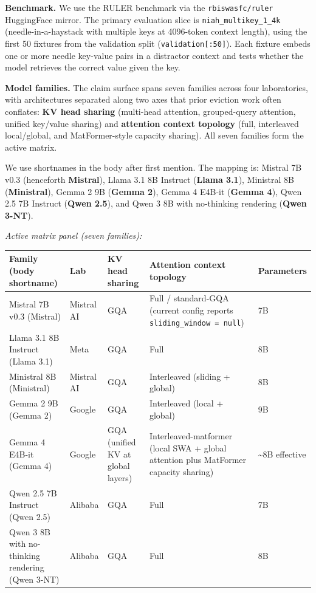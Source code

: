 \documentclass[
]{article}
\newcounter{none} %
\begin{document}
\textbf{Benchmark.} We use the RULER benchmark \citep{hsieh2024ruler} via
the \texttt{rbiswasfc/ruler} HuggingFace mirror. The primary evaluation
slice is \texttt{niah\_multikey\_1\_4k} (needle-in-a-haystack with
multiple keys at 4096-token context length), using the first 50 fixtures
from the validation split (\texttt{validation{[}:50{]}}). Each fixture
embeds one or more needle key-value pairs in a distractor context and
tests whether the model retrieves the correct value given the key.

\textbf{Model families.} The claim surface spans seven families across
four laboratories, with architectures separated along two axes that
prior eviction work often conflates: \textbf{KV head sharing}
(multi-head attention, grouped-query attention, unified key/value
sharing) and \textbf{attention context topology} (full, interleaved
local/global, and MatFormer-style capacity sharing). All seven families
form the active matrix.

We use shortnames in the body after first mention. The mapping is:
Mistral 7B v0.3 (henceforth \textbf{Mistral}), Llama 3.1 8B Instruct
(\textbf{Llama 3.1}), Ministral 8B (\textbf{Ministral}), Gemma 2 9B
(\textbf{Gemma 2}), Gemma 4 E4B-it (\textbf{Gemma 4}), Qwen 2.5 7B
Instruct (\textbf{Qwen 2.5}), and Qwen 3 8B with no-thinking rendering
(\textbf{Qwen 3-NT}).

\emph{Active matrix panel (seven families):}

{\def\LTcaptype{none} %
{\scriptsize\setlength{\tabcolsep}{2pt}\renewcommand{\arraystretch}{0.92} \begin{longtable}[]{@{}p{2.8cm}lp{2.4cm}p{3.5cm}l@{}}
\toprule\noalign{}
Family (body shortname) & Lab & KV head sharing & Attention context
topology & Parameters \\
\midrule\noalign{}
\endhead
\bottomrule\noalign{}
\endlastfoot
Mistral 7B v0.3 (Mistral) & Mistral AI & GQA & Full / standard-GQA
(current config reports \texttt{sliding\_window\ =\ null}) & 7B \\
Llama 3.1 8B Instruct (Llama 3.1) & Meta & GQA & Full & 8B \\
Ministral 8B (Ministral) & Mistral AI & GQA & Interleaved (sliding +
global) & 8B \\
Gemma 2 9B (Gemma 2) & Google & GQA & Interleaved (local + global) &
9B \\
Gemma 4 E4B-it (Gemma 4) & Google & GQA (unified KV at global layers)
& Interleaved-matformer (local SWA + global attention plus MatFormer
capacity sharing) & \textasciitilde8B effective \\
Qwen 2.5 7B Instruct (Qwen 2.5) & Alibaba & GQA & Full & 7B \\
Qwen 3 8B with no-thinking rendering (Qwen 3-NT) & Alibaba & GQA &
Full & 8B \\
\end{longtable}}
}
\end{document}
